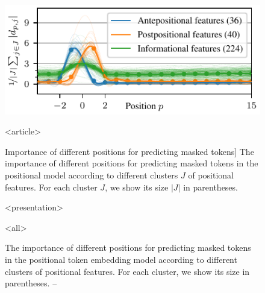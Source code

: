 \begin{figure}

\centering

\includegraphics[width=0.7\columnwidth]{positional-features}

\vspace{-0.2cm}

\mode
<article>

\caption
  [Importance of different positions for predicting masked tokens]%
  {The importance of different positions for predicting masked tokens in
   the positional model according to different clusters $J$ of positional
   features. For each cluster $J$, we show its size $|J|$ in parentheses.
   \cite[Figure 4]{novotny2022when}}

\protect{}
\protect{}
\protect{}

\mode
<presentation>

\caption
  {The importance of different positions for predicting masked tokens in
   the positional token embedding model according to different clusters of
   positional features. For each cluster, we show its size in parentheses.
   -- \textcite[Figure 4]{novotny2022when}}

\mode
<all>

\label{fig:position-independent-token-embeddings-interpretability}
\end{figure}
